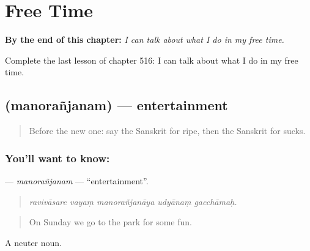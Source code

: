 
\chapter{Free Time}
\label{ch:sa-free-time}

\begin{chapteropening}
\textbf{By the end of this chapter:} \emph{I can talk about what I do in my free time.}

Complete the last lesson of chapter 516: I can talk about what I do in my free time.
\end{chapteropening}

\section[\texorpdfstring{\sk{मनोरञ्जनम्} (manorañjanam)}{मनोरञ्जनम् (manorañjanam)}]{ (manorañjanam) — entertainment}

\label{lesson:SA-C516-manoranjanam}



\begin{quote}
Before the new one: say the Sanskrit for ripe, then the Sanskrit for sucks.
\end{quote}

\subsection*{You'll want to know: }
\textbf{} — \emph{manorañjanam} — \textquotedblleft{}entertainment\textquotedblright{}.

\begin{quote}
    
\end{quote}

\begin{quote}
\emph{ravivāsare vayaṃ manorañjanāya udyānaṃ gacchāmaḥ.}
\end{quote}

\begin{quote}
On Sunday we go to the park for some fun.
\end{quote}

A neuter noun.

